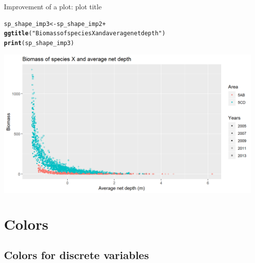 \documentclass{beamer}\usepackage[]{graphicx}\usepackage[]{color}
\makeatletter
\newcommand{\hlstr}[1]{\textcolor[rgb]{0.192,0.494,0.8}{#1}}%
\newcommand{\hlopt}[1]{\textcolor[rgb]{0,0,0}{#1}}%
\newcommand{\hlstd}[1]{\textcolor[rgb]{0.345,0.345,0.345}{#1}}%
\newcommand{\hlkwb}[1]{\textcolor[rgb]{0.69,0.353,0.396}{#1}}%
\newcommand{\hlkwd}[1]{\textcolor[rgb]{0.737,0.353,0.396}{\textbf{#1}}}%
\newenvironment{kframe}{%
 \def\at@end@of@kframe{}%
 \ifinner\ifhmode%
  \def\at@end@of@kframe{\end{minipage}}%
  \begin{minipage}{\columnwidth}%
 \fi\fi%
 \def\FrameCommand##1{\hskip\@totalleftmargin \hskip-\fboxsep
 \colorbox{shadecolor}{##1}\hskip-\fboxsep
     \hskip-\linewidth \hskip-\@totalleftmargin \hskip\columnwidth}%
 \MakeFramed {\advance\hsize-\width
   \@totalleftmargin\z@ \linewidth\hsize
   \@setminipage}}%
 {\par\unskip\endMakeFramed%
 \at@end@of@kframe}
\newenvironment{knitrout}{}{} %
\makeatother
\begin{document}
\begin{frame}[fragile]{Improvement of a plot: plot title}
\begin{knitrout}\footnotesize
{}\color{fgcolor}\begin{kframe}
\begin{alltt}
\hlstd{sp_shape_imp3} \hlkwb{<-} \hlstd{sp_shape_imp2} \hlopt{+}
  \hlkwd{ggtitle}\hlstd{(}\hlstr{"Biomass of species X and average net depth"}\hlstd{)}
\hlkwd{print}\hlstd{(sp_shape_imp3)}
\end{alltt}
\end{kframe}

{\centering \includegraphics[width=.9\linewidth]{figure/sp_shape_imp3-1} 

}



\end{knitrout}
\end{frame}

\section{Colors}

\subsection{Colors for discrete variables}
\end{document}
